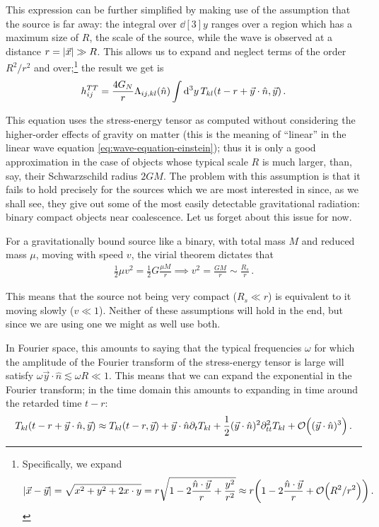\documentclass[main.tex]{subfiles}
\begin{document}
This expression can be further simplified by making use of the assumption that the source is far away: the integral over \(\dd[3]{y}\) ranges over a region which has a maximum size of \(R\), the scale of the source, while the wave is observed at a distance \(r = \abs{\vec{x}} \gg R\). 
This allows us to expand and neglect terms of the order \(R^2 / r^2\) and over;\footnote{
    Specifically, we expand 
    \begin{align}
    \abs{\vec{x} - \vec{y}} = \sqrt{x^2 + y^2 + 2 x \cdot y} 
    = r \sqrt{1 - 2 \frac{\hat{n} \cdot \vec{y}}{r} + \frac{y^2}{r^2}}
    \approx r \qty(1 - 2 \frac{\hat{n} \cdot \vec{y}}{r} + \order{R^2/ r^2})
    \,.
    \end{align}
} the result we get is 
%
\begin{align}
h_{ij}^{TT} = \frac{4 G_N}{r} \Lambda_{ij, kl} (\hat{n})
\int \dd[3]{y} T_{kl} \qty(t-r + \vec{y}\cdot \hat{n}, \vec{y}) 
\,.
\end{align}

This equation uses the stress-energy tensor as computed without considering the higher-order effects of gravity on matter (this is the meaning of ``linear'' in the linear wave equation \eqref{eq:wave-equation-einstein}); thus it is only a good approximation in the case of objects whose typical scale \(R\) is much larger, than, say, their Schwarzschild radius \(2GM\). 
The problem with this assumption is that it fails to hold precisely for the sources which we are most interested in since, as we shall see, they give out some of the most easily detectable gravitational radiation: binary compact objects near coalescence. 
Let us forget about this issue for now. 

For a gravitationally bound source like a binary, with total mass \(M\) and reduced mass \(\mu \), moving with speed \(v\), the virial theorem dictates that 
%
\begin{align}
\frac{1}{2} \mu v^2 = \frac{1}{2} G \frac{\mu M}{r} \implies v^2 = \frac{GM}{r} \sim \frac{R_s}{r} 
\,.
\end{align}

This means that the source not being very compact (\(R_s \ll r\)) is equivalent to it moving slowly (\(v \ll 1\)). 
Neither of these assumptions will hold in the end, but since we are using one we might as well use both. 

In Fourier space, this amounts to saying that the typical frequencies \(\omega \) for which the amplitude of the Fourier transform of the stress-energy tensor is large will satisfy \(\omega \vec{y} \cdot \hat{n} \lesssim \omega R \ll 1\). 
This means that we can expand the exponential in the Fourier transform; in the time domain this amounts to expanding in time around the retarded time \(t - r\): 
%
\begin{align}
T_{kl} (t-r + \vec{y} \cdot \hat{n}, \vec{y}) \approx T_{kl} (t-r, \vec{y}) + \vec{y} \cdot \hat{n} \partial_{t} T_{kl} + \frac{1}{2} (\vec{y} \cdot \hat{n})^2 \partial^2_{tt} T_{kl} + \order{(\vec{y} \cdot \hat{n})^3}
\,.
\end{align}
\end{document}
